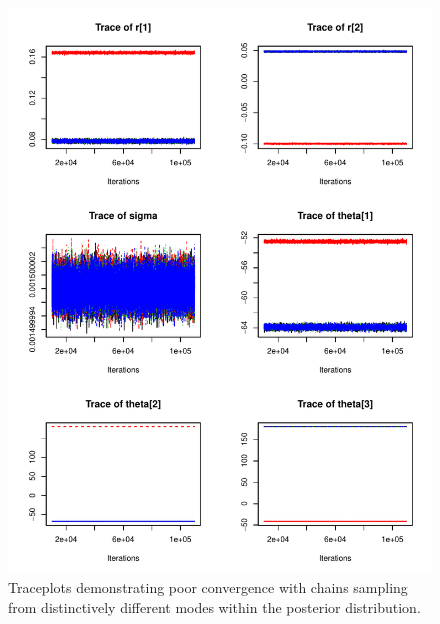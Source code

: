 \documentclass{article}
\begin{document}
\begin{figure}
\centering
\includegraphics[width=\textwidth]{./Figures/traceplot_poor.pdf}
\caption{Traceplots demonstrating poor convergence with chains sampling from distinctively different modes within the posterior distribution.}
\label{fig:Traceplot_random}
\end{figure}


\end{document}
